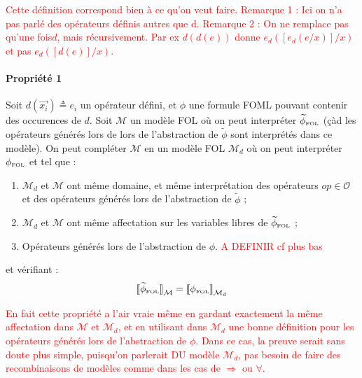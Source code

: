 \documentclass[12pt]{article}
\newcommand{\FOL}{\ensuremath{\textup{\tiny{}FOL}}}
\newcommand{\raph}[1]{\textcolor{red}{#1}}
\begin{document}
\raph{%
  Cette définition correspond bien à ce qu'on veut faire.
  Remarque 1 : Ici on n'a pas parlé des opérateurs définis autres que d.
  Remarque 2 : On ne remplace pas \og{}qu'une fois\fg $d$, mais récursivement.
  Par ex $d(d(e))$ donne $e_d([e_d(e/x)]/x)$ et pas $e_d([d(e)]/x)$.}

\paragraph{Propriété 1}
\label{prop_sem}
Soit $d(\vec{x_i}) \triangleq e_i$ un opérateur défini, et $\phi$ une formule FOML pouvant contenir des occurences de $d$.
Soit $\mathcal{M}$ un modèle FOL où on peut interpréter $\widetilde{\phi}_\FOL$ (çàd les opérateurs générés lors de lors de l'abstraction de $\widetilde{\phi}$ sont interprétés dans ce modèle).
On peut compléter $\mathcal{M}$ en un modèle FOL $\mathcal{M}_d$ où on peut interpréter $\phi_\FOL$ et tel que :
\begin{enumerate}
\item
  $\mathcal{M}_d$ et $\mathcal{M}$ ont même domaine, et même interprétation des opérateurs $op \in \mathcal{O}$ et des opérateurs générés lors de l'abstraction de $\widetilde{\phi}$ ;
\item
  $\mathcal{M}_d$ et $\mathcal{M}$ ont même affectation sur les variables libres de $\widetilde{\phi}_\FOL$ ;
\item
  Opérateurs générés lors de l'abstraction de $\phi$.
  \raph{A DEFINIR cf plus bas}
\end{enumerate}
et vérifiant :
\[
  {\llbracket \widetilde{\phi}_\FOL \rrbracket}_{\mathcal{M}} = {\llbracket \phi_\FOL \rrbracket}_{\mathcal{M}_d}
\]

\raph{%
  En fait cette propriété a l'air vraie même en gardant exactement la même affectation dans $\mathcal{M}$ et $\mathcal{M}_d$, et en utilisant dans $\mathcal{M}_d$ une bonne définition pour les opérateurs générés lors de l'abstraction de $\phi$.
  Dans ce cas, la preuve serait sans doute plus simple, puisqu'on parlerait DU modèle $\mathcal{M}_d$, pas besoin de faire des recombinaisons de modèles comme dans les cas de $\Rightarrow$ ou $\forall$.}
\end{document}
